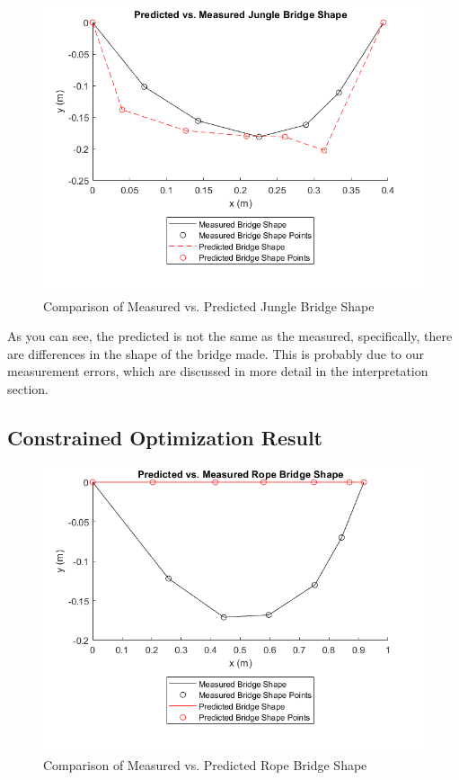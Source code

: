 \documentclass[10pt,letterpaper,onecolumn,report]{tau-class/tau}
\begin{document}
        \begin{figure}[H]
            \centering
            \setcounter{figure}{5} %
            \includegraphics[width=0.5\linewidth]{figures/figure 6; measured vs. predicted jungle bridge shape.png}
            \caption{Comparison of Measured vs. Predicted Jungle Bridge Shape}
            \label{fig:enter-label}
        \end{figure}
        
        As you can see, the predicted is not the same as the measured, specifically, there are differences in the shape of the bridge made. This is probably due to our measurement errors, which are discussed in more detail in the interpretation section.
        
    \subsection{Constrained Optimization Result}
        
        \begin{figure}
            \centering
            \setcounter{figure}{6} %
            \includegraphics[width=0.5\linewidth]{figures/figure 7; measured vs. predicted rope bridge shape.png}
            \caption{Comparison of Measured vs. Predicted Rope Bridge Shape}
            \label{fig:enter-label}
        \end{figure}
                
\end{document}
